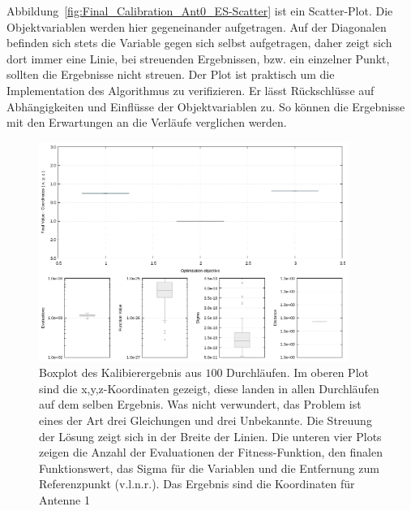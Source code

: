 Abbildung~\ref{fig:Final_Calibration_Ant0_ES-Scatter} ist ein Scatter-Plot. Die Objektvariablen werden hier gegeneinander aufgetragen. Auf der Diagonalen befinden sich stets die Variable gegen sich selbst aufgetragen, daher zeigt sich dort immer eine Linie, bei streuenden Ergebnissen, bzw. ein einzelner Punkt, sollten die Ergebnisse nicht streuen. Der Plot ist praktisch um die Implementation des Algorithmus zu verifizieren. Er lässt Rückschlüsse auf Abhängigkeiten und Einflüsse der Objektvariablen zu. So können die Ergebnisse mit den Erwartungen an die Verläufe verglichen werden.\\
%
%
\begin{figure}[!ht]
  \begin{center}
   \caption[Box-Plot der Endergebnisse der Kalibierung]{Boxplot des Kalibierergebnis aus $100$ Durchläufen. Im oberen Plot sind die x,y,z-Koordinaten gezeigt, diese landen in allen Durchläufen auf dem selben Ergebnis. Was nicht verwundert, das Problem ist eines der Art \glqq{}drei Gleichungen und drei Unbekannte\grqq. Die Streuung der Lösung zeigt sich in der Breite der Linien. Die unteren vier Plots zeigen die Anzahl der Evaluationen der Fitness-Funktion, den finalen Funktionswert, das Sigma für die Variablen und die Entfernung zum Referenzpunkt (v.l.n.r.). Das Ergebnis sind die Koordinaten für Antenne 1}
    \label{fig:Final_Calibration_Ant0_ES-boxes}
    \includegraphics[width=0.9\textwidth]{img/calibration/calibration_ant0-boxes.png}
  \end{center}
 
%
\end{figure}
%
%

